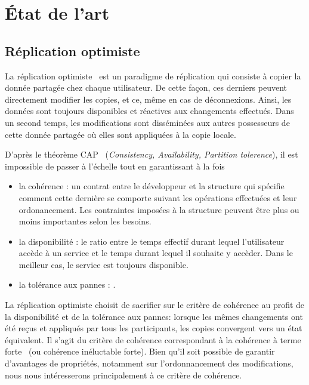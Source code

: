 
\section{État de l'art}

\label{lseq:sec:stateoftheart}

\subsection{Réplication optimiste}

La réplication optimiste~\cite{demers1987epidemic, saito2005optimistic} est un
paradigme de réplication qui consiste à copier la donnée partagée chez chaque
utilisateur. De cette façon, ces derniers peuvent directement modifier les
copies, et ce, même en cas de déconnexions.  Ainsi, les données sont toujours
disponibles et réactives aux changements effectués. Dans un second temps, les
modifications sont disséminées aux autres possesseurs de cette donnée partagée
où elles sont appliquées à la copie locale.

D'après le théorème CAP~\cite{gilbert2002brewer} (\emph{Consistency,
  Availability, Partition tolerence}), il est impossible de passer à l'échelle
tout en garantissant à la fois
\begin{itemize}
\item la cohérence : un contrat entre le développeur et la structure qui
  spécifie comment cette dernière se comporte suivant les opérations effectuées
  et leur ordonancement. Les contraintes imposées à la structure peuvent être
  plus ou moins importantes selon les besoins.
\item la disponibilité : le ratio entre le temps effectif durant lequel
  l'utilisateur accède à un service et le temps durant lequel il souhaite y
  accèder. Dans le meilleur cas, le service est toujours disponible. 
\item la tolérance aux pannes : .
\end{itemize}

La réplication optimiste choisit de sacrifier sur le critère de cohérence au
profit de la disponibilité et de la tolérance aux pannes: lorsque les mêmes
changements ont été reçus et appliqués par tous les participants, les copies
convergent vers un état équivalent. Il s'agit du critère de cohérence
correspondant à la cohérence à terme forte~\cite{shapiro2011conflict} (ou
cohérence inéluctable forte). Bien qu'il soit possible de garantir d'avantages
de propriétés, notamment sur l'ordonnancement des modifications, nous nous
intéresserons principalement à ce critère de cohérence.

